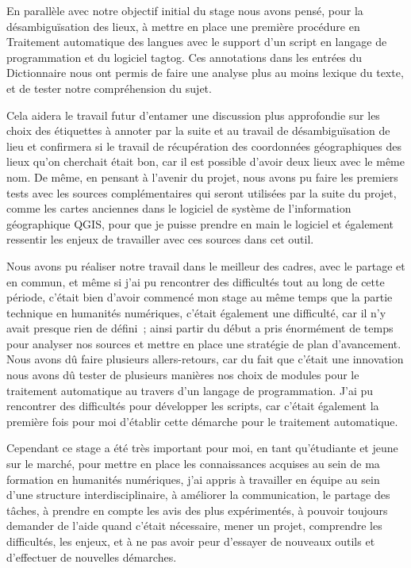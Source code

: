 \documentclass[a4paper,12pt,twoside]{book}
\begin{document}
En parallèle avec notre objectif initial du stage nous avons pensé, pour la désambiguïsation des lieux, à mettre en place une première procédure en Traitement automatique des langues avec le support d’un script en langage de programmation et du logiciel tagtog. Ces annotations dans les entrées du Dictionnaire nous ont permis de faire une analyse plus au moins lexique du texte, et de tester notre compréhension du sujet. 
	
Cela aidera le travail futur d’entamer une discussion plus approfondie sur les choix des étiquettes à annoter par la suite et au travail de désambiguïsation de lieu et confirmera si le travail de récupération des coordonnées géographiques des lieux qu’on cherchait était bon, car il est possible d’avoir deux lieux avec le même nom. De même, en pensant à l’avenir du projet, nous avons pu faire les premiers tests avec les sources complémentaires qui seront utilisées par la suite du projet, comme les cartes anciennes dans le logiciel de système de l’information géographique QGIS, pour que je puisse prendre en main le logiciel et également ressentir les enjeux de travailler avec ces sources dans cet outil. 

Nous avons pu réaliser notre travail dans le meilleur des cadres, avec le partage et en commun, et même si j’ai pu rencontrer des difficultés tout au long de cette période, c’était bien d’avoir commencé mon stage au même temps que la partie technique en humanités numériques, c’était également une difficulté, car il n’y avait presque rien de défini ; ainsi partir du début a pris énormément de temps pour analyser nos sources et mettre en place une stratégie de plan d’avancement. Nous avons dû faire plusieurs allers-retours, car du fait que c’était une innovation nous avons dû tester de plusieurs manières nos choix de modules pour le traitement automatique au travers d’un langage de programmation. J’ai pu rencontrer des difficultés pour développer les scripts, car c’était également la première fois pour moi d’établir cette démarche pour le traitement automatique. 

Cependant ce stage a été très important pour moi, en tant qu’étudiante et jeune sur le marché, pour mettre en place les connaissances acquises au sein de ma formation en humanités numériques, j’ai appris à travailler en équipe au sein d’une structure interdisciplinaire, à améliorer la communication, le partage des tâches, à prendre en compte les avis des plus expérimentés, à pouvoir toujours demander de l’aide quand c’était nécessaire, mener un projet, comprendre les difficultés, les enjeux, et à ne pas avoir peur d’essayer de nouveaux outils et d’effectuer de  nouvelles démarches. 
	
\end{document}
